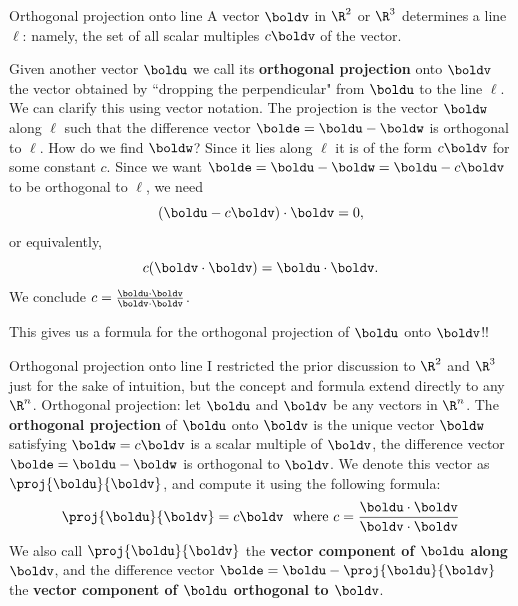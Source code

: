 \begin{frame}{Orthogonal projection onto line}
A vector $\boldv$ in $\R^2$ or $\R^3$ determines a line $\ell$: namely, the set of all scalar multiples $c\boldv$ of the vector. 

Given another vector $\boldu$ we call its {\bf orthogonal projection} onto $\boldv$ the vector obtained by ``dropping the perpendicular" from $\boldu$ to the line $\ell$. 
\bpause 
We can clarify this using vector notation. The projection is the vector $\boldw$ along $\ell$ such that the difference vector $\bolde=\boldu-\boldw$ is \alert{orthogonal} to $\ell$.
\bpause
How do we find $\boldw$?  Since it lies along $\ell$ it is of the form $c\boldv$ for some constant $c$. Since we want $\bolde=\boldu-\boldw=\boldu-c\boldv$ to be orthogonal to $\ell$, we need 
\[
(\boldu-c\boldv)\cdot\boldv=0,
\]
or equivalently, 
\[
c(\boldv\cdot\boldv)=\boldu\cdot\boldv.
\]
\pause We conclude $c=\frac{\boldu\cdot\boldv}{\boldv\cdot\boldv}$. 

This gives us a formula for the orthogonal projection of $\boldu$ onto $\boldv$!!
\end{frame}
\begin{frame}{Orthogonal projection onto line}
I restricted the prior discussion to $\R^2$ and $\R^3$ just for the sake of intuition, but the concept and formula extend directly to any $\R^n$. 
\bpause
\alert{Orthogonal projection:} let $\boldu$ and $\boldv$ be any vectors in $\R^n$. The {\bf orthogonal projection} of $\boldu$ onto $\boldv$ is the unique vector $\boldw$ satisfying 
\bb[(i)]
\ii $\boldw=c\boldv$ is a scalar multiple of $\boldv$, 
\ii the difference vector $\bolde=\boldu-\boldw$ is orthogonal to $\boldv$. 
\ee
We denote this vector as $\proj{\boldu}{\boldv}$, and compute it using the following formula:
\[
\proj{\boldu}{\boldv}=c\boldv \ \text{ where  } c=\frac{\boldu\cdot\boldv}{\boldv\cdot\boldv}
\] 
We also call $\proj{\boldu}{\boldv}$ the {\bf vector component of $\boldu$ along $\boldv$}, and the difference vector $\bolde=\boldu-\proj{\boldu}{\boldv}$ the {\bf vector component of $\boldu$ orthogonal to $\boldv$}. 
\end{frame}
